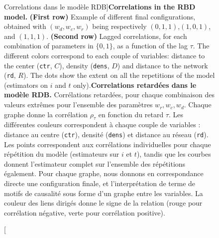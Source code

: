 \begin{figure}
\caption[Correlation in the RBD model][Correlations dans le modèle RDB]{\textbf{Correlations in the RBD model.} \textbf{(First row)} Example of different final configurations, obtained with $(w_{d},w_{c},w_{r})$ being respectively $(0,1,1)$,$(1,0,1)$, and $(1,1,1)$. \textbf{(Second row)} Lagged correlations, for each combination of parameters in $\{0,1\}$, as a function of the lag $\tau$. The different colors correspond to each couple of variables: distance to the center (\texttt{ctr}, $C$), density (\texttt{dens}, $D$) and distance to the network (\texttt{rd}, $R$). The dots show the extent on all the repetitions of the model (estimators on $i$ and $t$ only).\label{fig:causalityregimes:exrdb}}{\textbf{Correlations retardées dans le modèle RDB.} Corrélations retardées, pour chaque combinaison des valeurs extrêmes pour l'ensemble des paramètres $w_r,w_c,w_d$. Chaque graphe donne la corrélation $\rho_{\tau}$ en fonction du retard $\tau$. Les différentes couleurs correspondent à chaque couple de variables : distance au centre (\texttt{ctr}), densité (\texttt{dens}) et distance au réseau (\texttt{rd}). Les points correspondent aux corrélations individuelles pour chaque répétition du modèle (estimateurs sur $i$ et $t$), tandis que les courbes donnent l'estimateur complet sur l'ensemble des répétitions également. Pour chaque graphe, nous donnons en correspondance directe une configuration finale, et l'interprétation de terme de motifs de causalité sous forme d'un graphe entre les variables. La couleur des liens dirigés donne le signe de la relation (rouge pour corrélation négative, verte pour corrélation positive).\label{fig:causalityregimes:exrdb}}
\end{figure}




